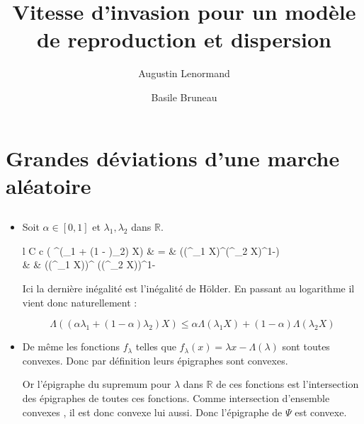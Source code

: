 \documentclass[12pt,titlepage=true]{article}
\title{Vitesse d'invasion pour un modèle de reproduction et dispersion}
\author{Augustin Lenormand \and Basile Bruneau}
\renewcommand\labelitemi{\textbullet}
\newcommand{\esp}{\mathbb{E}}
\renewcommand{\exp}{\mathrm{e}^}
\begin{document}
	\maketitle

	\section{Grandes déviations d'une marche aléatoire}
		\subsection{}\setcounter{equation}{0} %
			
			\renewcommand\labelitemi{\textbullet}
			
			\begin{itemize}
	
				\item	Soit $\alpha\in [0,1]$ et $\lambda_1, \lambda_2$ dans $\mathbb{R}$.
	
						\begin{IEEEeqnarray*}{l C c}
							\esp( \exp{(\alpha \lambda_1 + (1 - \alpha)\lambda_2) X}) &     =     &  \esp((\exp{\lambda_1 X})^{\alpha}(\exp{\lambda_2 X})^{1-\alpha})\\
																   					  & \leqslant & (\esp(\exp{\lambda_1 X}))^{\alpha} (\esp(\exp{\lambda_2 X}))^{1- \alpha}
						\end{IEEEeqnarray*}
	
	
						Ici la dernière inégalité est l'inégalité de Hölder. En passant au logarithme il vient donc naturellement :	
	
						\begin{equation*}
							\Lambda((\alpha \lambda_1 + (1 - \alpha)\lambda_2) X) \leqslant \alpha \Lambda(\lambda_1 X) + (1-\alpha) \Lambda(\lambda_2 X)
						\end{equation*}
		
		
				\item	De même les fonctions $f_\lambda$ telles que $f_\lambda (x)=\lambda x - \Lambda (\lambda)$ sont toutes convexes. Donc par définition leurs épigraphes sont convexes.
			
						Or l'épigraphe du supremum pour $\lambda$ dans $\mathbb{R}$ de ces fonctions est l'intersection des épigraphes de toutes ces fonctions. Comme intersection d'ensemble convexes , il est donc convexe lui aussi. Donc l'épigraphe de $\Psi$ est convexe.
		

\end{itemize}
\end{document}
